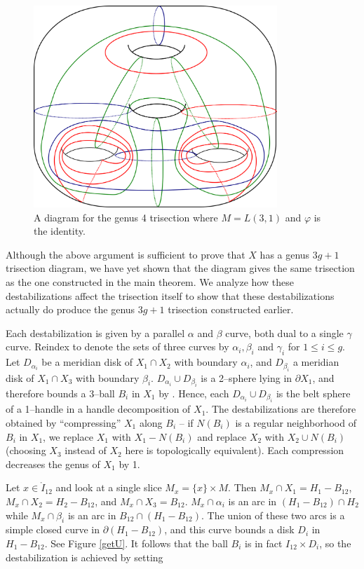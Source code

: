 \documentclass[12pt]{amsart}
\newcommand{\del}{\partial }
\theoremstyle{definition}
\theoremstyle{remark}
\begin{document}
\begin{figure}[h]
\centering
\includegraphics[height=3in]{LxS12destab.png}
\caption{A diagram for the genus 4 trisection where $M = L(3,1)$ and $\varphi$ is the identity.
}
\label{ls12destab}
\end{figure}

Although the above argument is sufficient to prove that $X$ has a genus $3g+1$ trisection diagram, we have yet shown that the diagram gives the same trisection as the one constructed in the main theorem.
We analyze how these destabilizations affect the trisection itself to show that these destabilizations actually do produce the genus $3g+1$ trisection constructed earlier.


Each destabilization is given by a parallel $\alpha$ and $\beta$ curve, both dual to a single $\gamma$ curve.
Reindex to denote the sets of three curves by $\alpha_i,\beta_i$ and $\gamma_i$ for $1 \le i \le g$.
Let $D_{\alpha_i}$ be a meridian disk of $X_1 \cap X_2$ with boundary $\alpha_i$, and $D_{\beta_i}$ a meridian disk of $X_1 \cap X_3$ with boundary $\beta_i$.
$D_{\alpha_i} \cup D_{\beta_i}$ is a 2--sphere lying in $\del X_1$, and therefore bounds a 3--ball $B_i$ in $X_1$ by \cite{LaudenbachPoenaru1}.
Hence, each $D_{\alpha_i} \cup D_{\beta_i}$ is the belt sphere of a 1--handle in a handle decomposition of $X_1$.
The destabilizations are therefore obtained by ``compressing'' $X_1$ along $B_i$ -- if $N(B_i)$ is a regular neighborhood of $B_i$ in $X_1$, we replace $X_1$ with $X_1 - N(B_i)$ and replace $X_2$ with $X_2 \cup N(B_i)$ (choosing $X_3$ instead of $X_2$ here is topologically equivalent).
Each compression decreases the genus of $X_1$ by 1.

Let $x \in \mathring I_{12}$ and look at a single slice $M_x = \{x\} \times M$.
Then $M_x \cap X_1 = H_1 - B_{12}$, $M_x \cap X_2 = H_2 - B_{12}$, and $M_x \cap X_3 = B_{12}$.
$M_x \cap \alpha_i$ is an arc in $(H_1 - B_{12}) \cap H_2$ while $M_x \cap \beta_i$ is an arc in $B_{12} \cap (H_1 - B_{12})$.
The union of these two arcs is a simple closed curve in $\del (H_1 - B_{12})$, and this curve bounds a disk $D_i$ in $H_1 - B_{12}$.
See Figure \ref{getU}.
It follows that the ball $B_i$ is in fact $I_{12} \times D_i$, so the destabilization is achieved by setting
\end{document}
